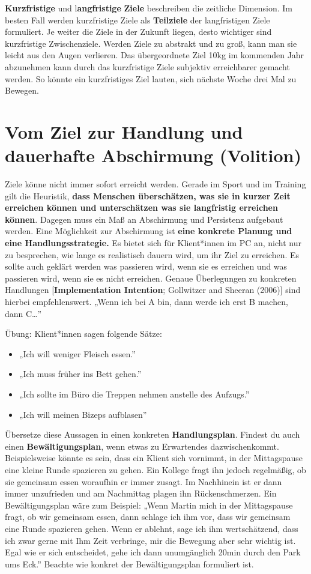 \documentclass[
  letterpaper,
  DIV=11,
  numbers=noendperiod]{scrreprt}
\providecommand{\tightlist}{%
  \setlength{\itemsep}{0pt}\setlength{\parskip}{0pt}}
\begin{document}
\textbf{Kurzfristige} und l\textbf{angfristige} \textbf{Ziele}
beschreiben die zeitliche Dimension. Im besten Fall werden kurzfristige
Ziele als \textbf{Teilziele} der langfristigen Ziele formuliert. Je
weiter die Ziele in der Zukunft liegen, desto wichtiger sind
kurzfristige Zwischenziele. Werden Ziele zu abstrakt und zu groß, kann
man sie leicht aus den Augen verlieren. Das übergeordnete Ziel 10kg im
kommenden Jahr abzunehmen kann durch das kurzfristige Ziele subjektiv
erreichbarer gemacht werden. So könnte ein kurzfristiges Ziel lauten,
sich nächste Woche drei Mal zu Bewegen.

\section{Vom Ziel zur Handlung und dauerhafte Abschirmung
(Volition)}\label{sec-ziel-handlung}

Ziele könne nicht immer sofort erreicht werden. Gerade im Sport und im
Training gilt die Heuristik, \textbf{dass Menschen überschätzen, was sie
in kurzer Zeit erreichen können und unterschätzen was sie langfristig
erreichen können}. Dagegen muss ein Maß an Abschirmung und Persistenz
aufgebaut werden. Eine Möglichkeit zur Abschirmung ist \textbf{eine
konkrete Planung und eine Handlungsstrategie.} Es bietet sich für
Klient*innen im PC an, nicht nur zu besprechen, wie lange es realistisch
dauern wird, um ihr Ziel zu erreichen. Es sollte auch geklärt werden was
passieren wird, wenn sie es erreichen und was passieren wird, wenn sie
es nicht erreichen. Genaue Überlegungen zu konkreten Handlungen
{[}\textbf{Implementation Intention}; Gollwitzer and Sheeran (2006){]}
sind hierbei empfehlenswert. „Wenn ich bei A bin, dann werde ich erst B
machen, dann C\ldots''

Übung: Klient*innen sagen folgende Sätze:

\begin{itemize}
\tightlist
\item
  „Ich will weniger Fleisch essen.''
\item
  „Ich muss früher ins Bett gehen.''
\item
  „Ich sollte im Büro die Treppen nehmen anstelle des Aufzugs.''
\item
  „Ich will meinen Bizeps aufblasen''
\end{itemize}

Übersetze diese Aussagen in einen konkreten \textbf{Handlungsplan}.
Findest du auch einen \textbf{Bewältigungsplan}, wenn etwas zu
Erwartendes dazwischenkommt. Beispielsweise könnte es sein, dass ein
Klient sich vornimmt, in der Mittagspause eine kleine Runde spazieren zu
gehen. Ein Kollege fragt ihn jedoch regelmäßig, ob sie gemeinsam essen
woraufhin er immer zusagt. Im Nachhinein ist er dann immer unzufrieden
und am Nachmittag plagen ihn Rückenschmerzen. Ein Bewältigungsplan wäre
zum Beispiel: „Wenn Martin mich in der Mittagspause fragt, ob wir
gemeinsam essen, dann schlage ich ihm vor, dass wir gemeinsam eine Runde
spazieren gehen. Wenn er ablehnt, sage ich ihm wertschätzend, dass ich
zwar gerne mit Ihm Zeit verbringe, mir die Bewegung aber sehr wichtig
ist. Egal wie er sich entscheidet, gehe ich dann unumgänglich 20min
durch den Park ums Eck.'' Beachte wie konkret der Bewältigungsplan
formuliert ist.
\end{document}

